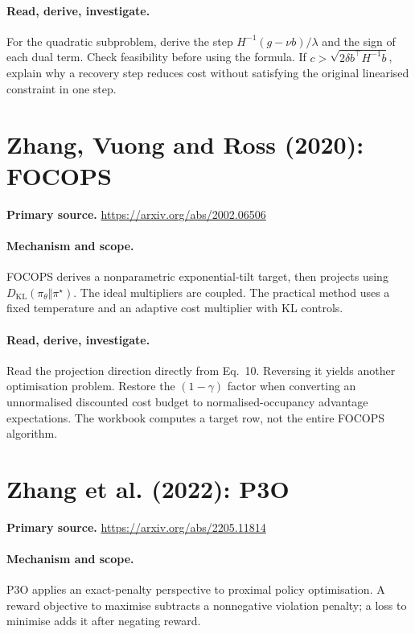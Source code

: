 \documentclass[11pt]{scrartcl}
\begin{document}
\paragraph{Read, derive, investigate.} For the quadratic subproblem, derive the step $H^{-1}(g-\nu b)/\lambda$ and the sign of each dual term. Check feasibility before using the formula. If $c>\sqrt{2\delta b^\top H^{-1}b}$, explain why a recovery step reduces cost without satisfying the original linearised constraint in one step.

\section{Zhang, Vuong and Ross (2020): FOCOPS}
\noindent\textbf{Primary source.} \url{https://arxiv.org/abs/2002.06506}

\paragraph{Mechanism and scope.} FOCOPS derives a nonparametric exponential-tilt target, then projects using $D_{\mathrm{KL}}(\pi_\theta\Vert\pi^\star)$. The ideal multipliers are coupled. The practical method uses a fixed temperature and an adaptive cost multiplier with KL controls.

\paragraph{Read, derive, investigate.} Read the projection direction directly from Eq.~10. Reversing it yields another optimisation problem. Restore the $(1-\gamma)$ factor when converting an unnormalised discounted cost budget to normalised-occupancy advantage expectations. The workbook computes a target row, not the entire FOCOPS algorithm.

\section{Zhang et al. (2022): P3O}
\noindent\textbf{Primary source.} \url{https://arxiv.org/abs/2205.11814}

\paragraph{Mechanism and scope.} P3O applies an exact-penalty perspective to proximal policy optimisation. A reward objective to maximise subtracts a nonnegative violation penalty; a loss to minimise adds it after negating reward.
\end{document}

